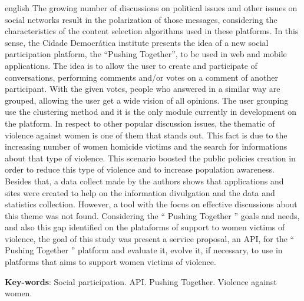 \begin{resumo}[Abstract]
 \begin{otherlanguage*}{english}
  The growing number of discussions on political issues and other issues on social networks
  result in the polarization of those messages, considering the characteristics 
  of the content selection algorithms used in these platforms. In this sense,
  the Cidade Democrática institute presents the idea of a new social participation 
  platform, the ``Pushing Together'', to be used in web and mobile applications.
  The idea is to allow the user to create and participate of conversations, performing 
  comments and/or votes on a comment of another participant. With the given votes, people 
  who answered in a similar way are grouped, allowing the user get a wide 
  vision of all opinions. The user grouping use the clustering method and it is the only
  module currently in development on the platform. In respect to other popular 
  discussion issues, the thematic of violence against women is one of them that stands out. This fact
  is due to the increasing number of women homicide victims and the search 
  for informations about that type of violence. This scenario boosted the public policies
  creation in order to reduce this type of violence and to increase population awareness.
  Besides that, a data collect made by the authors shows that
  applications and sites were created to help on the information divulgation and the 
  data and statistics collection. However, a tool with the focus on effective discussions about this theme was not found. 
  Considering the `` Pushing Together '' goals and needs, and also this gap identified on
  the plataforms of support to women victims of violence, 
  the goal of this study was present a service proposal, an API, for the `` Pushing Together ''
  platform and evaluate it, evolve it, if necessary, to use in platforms that aims to support women victims of violence.
  
  
   \vspace{\onelineskip}
 
   \noindent 
   \textbf{Key-words}: Social participation. API. Pushing Together. Violence against women.
 \end{otherlanguage*}
\end{resumo}
